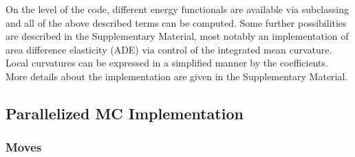 \documentclass[twocolumn]{biophys-new}
\begin{document}
On the level of the code, different energy functionals are available via subclassing and all of the above described terms can be computed. Some further possibilities are described in the Supplementary Material, most notably an implementation of area difference elasticity (ADE)\cite{PhysRevA.44.1182,PhysRevE.49.5389} via control of the integrated mean curvature. Local curvatures can be expressed in a simplified manner by the coefficients. More details about the implementation are given in the Supplementary Material.

\subsection*{Parallelized MC Implementation}
\subsubsection*{Moves}
\end{document}
